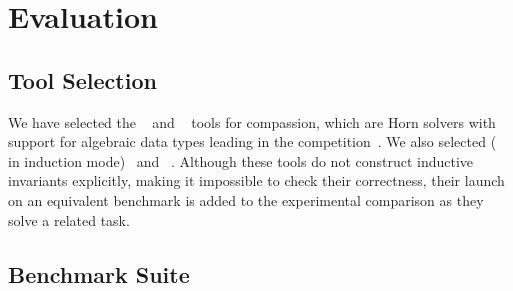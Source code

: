 \section{Evaluation}
\subsection{Tool Selection}
We have selected the \racer{}~\cite{10.1145/3498722} and \eldarica{}~\cite{8603013} tools for compassion, which are Horn solvers with support for algebraic data types leading in the \chccomp{} competition~\cite{De_Angelis_2022}. We also selected \cvcind{} (\cvc{} in induction mode)~\cite{reynolds2015induction} and \vericat{}~\cite{10.1093/logcom/exab090}. Although these tools do not construct inductive invariants explicitly, making it impossible to check their correctness, their launch on an equivalent benchmark is added to the experimental comparison as they solve a related task.



\subsection{Benchmark Suite}

